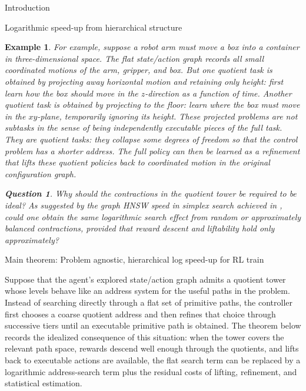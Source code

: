 \documentclass[11pt]{article}
\newtheorem{example}[subsubsection]{Example}
\newtheorem{question}[]{Question}
\begin{document}
\begin{section}{Introduction}
\begin{subsection}{Logarithmic speed-up from hierarchical structure}
\begin{example}
For example, suppose a robot arm must move a box into a container in three-dimensional space. The flat state/action graph records all small coordinated motions of the arm, gripper, and box. But one quotient task is obtained by projecting away horizontal motion and retaining only height: first learn how the box should move in the $z$-direction as a function of time. Another quotient task is obtained by projecting to the floor: learn where the box must move in the $xy$-plane, temporarily ignoring its height. These projected problems are not subtasks in the sense of being independently executable pieces of the full task. They are quotient tasks: they collapse some degrees of freedom so that the control problem has a shorter address. The full policy can then be learned as a refinement that lifts these quotient policies back to coordinated motion in the original configuration graph.

\begin{question}
Why should the contractions in the quotient tower be required to be ideal?  As suggested by the graph HNSW speed in simplex search achieved in \cite{MalikThesis}, could one obtain the same logarithmic search effect from random or approximately balanced contractions, provided that reward descent and liftability hold only approximately?
\end{question}
\end{example}


\end{subsection}

\begin{subsection}{Main theorem: Problem agnostic, hierarchical log speed-up for RL train}

Suppose that the agent's explored state/action graph admits a quotient tower whose levels behave like an address system for the useful paths in the problem. Instead of searching directly through a flat set of primitive paths, the controller first chooses a coarse quotient address and then refines that choice through successive tiers until an executable primitive path is obtained. The theorem below records the idealized consequence of this situation: when the tower covers the relevant path space, rewards descend well enough through the quotients, and lifts back to executable actions are available, the flat search term can be replaced by a logarithmic address-search term plus the residual costs of lifting, refinement, and statistical estimation.


\end{subsection}
\end{section}
\end{document}
